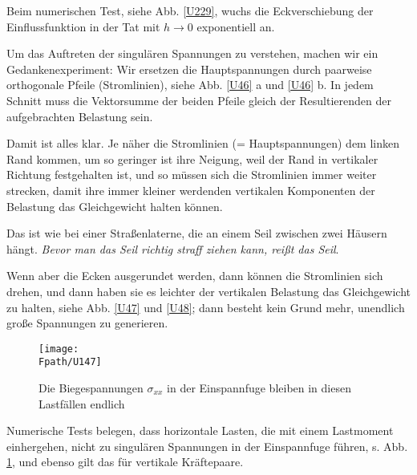 {{Beim numerischen Test, siehe Abb. \ref{U229}, wuchs die Eckverschiebung der Einflussfunktion in der Tat mit $h \to 0$ exponentiell an.

Um das Auftreten der singul\"{a}ren Spannungen zu verstehen, machen wir ein Gedankenexperiment: Wir ersetzen die Hauptspannungen durch  paarweise orthogonale Pfeile (\glq Stromlinien\grq), siehe Abb. \ref{U46} a und  \ref{U46} b. In jedem Schnitt muss die Vektorsumme der beiden Pfeile gleich der Resultierenden der aufgebrachten Belastung sein.

Damit ist alles klar. Je n\"{a}her die Stromlinien (= Hauptspannungen) dem linken Rand kommen, um so geringer ist ihre Neigung, weil der Rand in vertikaler Richtung festgehalten ist, und so m\"{u}ssen sich die Stromlinien immer weiter strecken, damit ihre immer kleiner werdenden vertikalen Komponenten der Belastung das Gleichgewicht halten k\"{o}nnen.

Das ist wie bei einer Stra{\ss}enlaterne, die an einem Seil zwischen zwei H\"{a}usern h\"{a}ngt. {\em Bevor man das Seil richtig straff ziehen kann, rei{\ss}t das Seil\/}.

Wenn aber die Ecken ausgerundet werden, dann k\"{o}nnen die Stromlinien sich drehen, und dann haben sie es leichter der vertikalen Belastung das Gleichgewicht zu halten, siehe Abb. \ref{U47} und \ref{U48}; dann besteht kein Grund mehr, unendlich gro{\ss}e Spannungen zu generieren.\\

\begin{figure}
\centering
\texttt{[image: \\Fpath/U147]}
\caption{Die Biegespannungen $\sigma_{xx}$ in der Einspannfuge bleiben in diesen Lastf\"{a}llen endlich}
\label{U147}%
\end{figure}%

\begin{remark}
 Numerische Tests belegen, dass horizontale Lasten, die mit einem Lastmoment einhergehen,  nicht zu singul\"{a}ren Spannungen in der Einspannfuge f\"{u}hren, s. Abb. \ref{U147}, und ebenso gilt das f\"{u}r vertikale Kr\"{a}ftepaare.
 \end{remark}


}}
